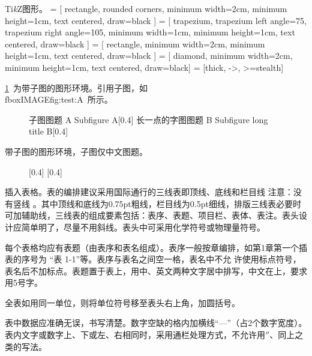 Ti\textit{k}Z图形。
\usetikzlibrary{shapes.geometric, arrows}
 = [
rectangle,
rounded corners,
minimum width=2cm,
minimum height=1cm,
text centered,
draw=black
]
 = [
trapezium,
trapezium left angle=75,
trapezium right angle=105,
minimum width=1cm,
minimum height=1cm,
text centered,
draw=black
]
 = [
rectangle,
minimum width=2cm,
minimum height=1cm,
text centered,
draw=black
]
 = [
diamond,
minimum width=2cm,
minimum height=1cm,
text centered,
draw=black]
 = [thick, ->, >=stealth]

\begin{figure}[htbp]
	\centering
\end{figure}

\cref{fig:test}~为带子图的图形环境。引用子图，如\\fbox{IMAGE}{fig:test:A}~所示。
\begin{figure}[htbp]
    \centering
    \bisubcaptionbox
    {子图图题 A\label{fig:test:A}}
    {Subfigure A}[0.4\textwidth]{}%
    \qquad
    \bisubcaptionbox
    {长一点的字图图题 B\label{fig:test:B}}
    {Subfigure long title B}[0.4\textwidth]{}%
    \label{fig:test}
\end{figure}

带子图的图形环境，子图仅中文图题。
\begin{figure}[htbp]
    \centering
    [0.4\textwidth]{}%
    \qquad
    [0.4\textwidth]{}%
\end{figure}

插入表格。表的编排建议采用国际通行的三线表即顶线、底线和栏目线 注意：没有竖线 。其中顶线和底线为0.75pt粗线，栏目线为0.5pt细线，排版三线表必要时可加辅助线，三线表的组成要素包括：表序、表题、项目栏、表体、表注。表头设计应简单明了，尽量不用斜线。表头中可采用化学符号或物理量符号。

每个表格均应有表题（由表序和表名组成）。表序一般按章编排，如第1章第一个插表的序号为 “表 1-1”等。表序与表名之间空一格，表名中不允 许使用标点符号，表名后不加标点。表题置于表上，用中、英文两种文字居中排写，中文在上，要求用5号字。

全表如用同一单位，则将单位符号移至表头右上角，加圆括号。

表中数据应准确无误，书写清楚。数字空缺的格内加横线“—”（占2个数字宽度）。表内文字或数字上、下或左、右相同时，采用通栏处理方式，不允许用$ '' $、同上之类的写法。

